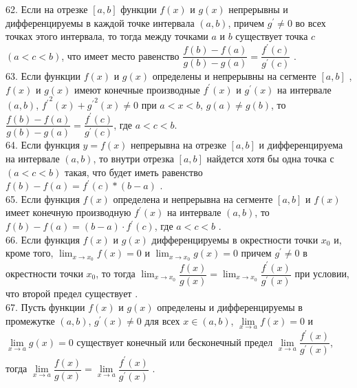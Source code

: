 \documentclass[12pt]{article}
\begin{document}
{{62. Если на отрезке ${\displaystyle [a,b]}$ функции ${\displaystyle f(x)}$ и ${\displaystyle g(x)}$ непрерывны и дифференцируемы в каждой точке интервала ${\displaystyle (a,b)}$, причем  ${\displaystyle g^{\prime}\neq 0}$ во всех точках этого интервала, то тогда между точками ${\displaystyle a}$ и  ${\displaystyle b}$ существует точка ${\displaystyle c}$ ${\displaystyle (a<c<b)}$, что имеет место равенство ${\displaystyle \dfrac{f(b)-f(a)}{g(b)-g(a)}=\dfrac{f^{\prime}(c)}{g^{\prime}(c)}}$ .\\

63. Если функции ${\displaystyle f(x)}$ и ${\displaystyle g(x)}$ определены и непрерывны на сегменте ${\displaystyle [a,b]}$ , ${\displaystyle f(x)}$ и ${\displaystyle g(x)}$ имеют конечные производные ${\displaystyle f^{\prime}(x)}$  и ${\displaystyle g^{\prime}(x)}$ на интервале ${\displaystyle (a,b)}$, ${\displaystyle {f^{\prime}}^2(x)+{g^{\prime}}^2(x) \neq 0}$ при ${\displaystyle a<x<b}$, ${\displaystyle g(a)\neq g(b)}$, то ${\displaystyle \dfrac{f(b)-f(a)}{g(b)-g(a)}=\dfrac{f^{\prime}(c)}{g^{\prime}(c)}}$, где ${\displaystyle a<c<b}$.\\

64. Если функция ${\displaystyle y=f(x)}$ непрерывна на отрезке ${\displaystyle [a,b]}$ и дифференцируема на интервале ${\displaystyle (a,b)}$, то внутри отрезка ${\displaystyle [a,b]}$ найдется хотя бы одна точка ${\displaystyle с}$ ${(\displaystyle a<c<b)}$ такая, что будет иметь равенство ${\displaystyle f(b)-f(a)=f^{\prime}(c)*(b-a)}$ .\\

65. Если функция ${\displaystyle f(x)}$ определена и непрерывна на сегменте ${\displaystyle [a,b]}$ и ${\displaystyle f(x)}$ имеет конечную производную ${\displaystyle f^{\prime}(x)}$ на интервале ${\displaystyle (a,b)}$, то ${\displaystyle f(b)-f(a)=(b-a)\cdot f^{\prime}(c)}$, где ${\displaystyle a<c<b}$ .\\

66. Если функция ${\displaystyle f(x)}$ и ${\displaystyle g(x)}$ дифференцируемы в окрестности точки ${\displaystyle x_0}$ и, кроме того, ${\displaystyle \lim _{x \to x_0} f(x)=0}$ и ${\displaystyle \lim _{x \to x_0} g(x)=0}$ причем ${\displaystyle g^{\prime}\neq 0}$ в окрестности точки ${\displaystyle x_0}$, то тогда ${\displaystyle \lim _{x \to x_0} \dfrac{f(x)}{g(x)}=\lim _{x \to x_0} \dfrac{f^{\prime}(x)}{g^{\prime}(x)}}$ при условии, что второй предел существует .\\

67. Пусть функции ${\displaystyle f(x)}$ и ${\displaystyle g(x)}$ определены и дифференцируемы в промежутке ${\displaystyle (a,b)}$, ${\displaystyle g^{\prime}(x) \neq 0}$ для всех ${\displaystyle x\in (a,b)}$, ${\displaystyle \lim \limits _{x \to a} f(x)=0}$ и ${\displaystyle \lim \limits _{x \to a} g(x)=0}$  существует конечный или бесконечный предел ${\displaystyle \lim \limits _{x \to a} \dfrac{f^{\prime}(x)}{g^{\prime}(x)}}$, тогда ${\displaystyle \lim \limits _{x \to a}\dfrac{f(x)}{g(x)}=\lim \limits _{x \to a} \dfrac{f^{\prime}(x)}{g^{\prime}(x)}}$ .\\

}}
\end{document}
